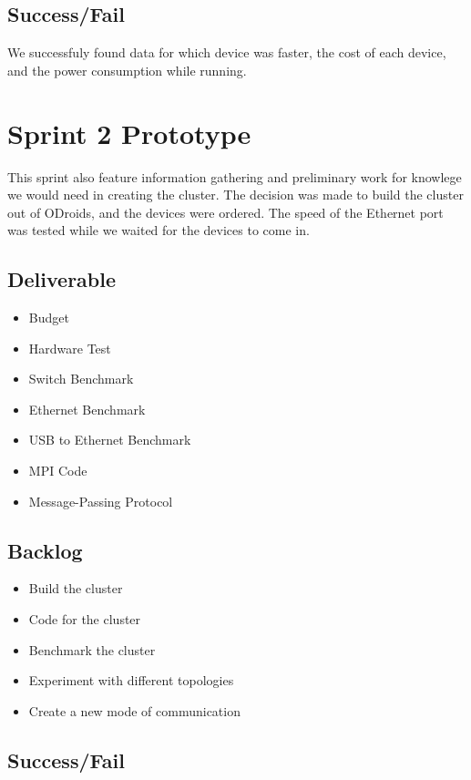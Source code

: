 \subsection{Success/Fail}

We successfuly found data for which device was faster, the cost of each device, and the power consumption while running.

\section{Sprint 2 Prototype}

This sprint also feature information gathering and preliminary work for knowlege we would need in creating the cluster. The decision was made to build the cluster out of ODroids, and the devices were ordered. The speed of the Ethernet port was tested while we waited for the devices to come in.

\subsection{Deliverable}

\begin{itemize}
\item Budget
\item Hardware Test
\item Switch Benchmark
\item Ethernet Benchmark
\item USB to Ethernet Benchmark
\item MPI Code
\item Message-Passing Protocol
\end{itemize}

\subsection{Backlog}

\begin{itemize}
\item Build the cluster
\item Code for the cluster
\item Benchmark the cluster
\item Experiment with different topologies
\item Create a new mode of communication
\end{itemize}

\subsection{Success/Fail}

